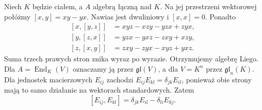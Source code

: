 \begin{przyklad}
\label{aa:prz:associative-lie}
Niech $K$ będzie ciałem, a $A$ algebrą łączną nad $K$.
Na jej przestrzeni wektorowej połóżmy $[x,y]=xy-yx$.
Nawias jest dwuliniowy i $[x,x]=0$.
Ponadto
\[
\begin{aligned}
 [x,[y,z]]&=xyz-xzy-yzx+zyx,\\
 [y,[z,x]]&=yzx-yxz-zxy+xzy,\\
 [z,[x,y]]&=zxy-zyx-xyz+yxz.
\end{aligned}
\]
Suma trzech prawych stron znika wyraz po wyrazie.
Otrzymujemy algebrę Liego. Dla $A=\operatorname{End}_K(V)$
oznaczamy ją przez $\mathfrak{gl}(V)$, a dla
$V=K^n$ przez $\mathfrak{gl}_n(K)$.
Dla jednostek macierzowych $E_{ij}$ zachodzi
$E_{ij}E_{kl}=\delta_{jk}E_{il}$, ponieważ obie
strony mają to samo działanie na wektorach standardowych.
Zatem
\[
 [E_{ij},E_{kl}]=\delta_{jk}E_{il}-\delta_{li}E_{kj}.
\]
\end{przyklad}

